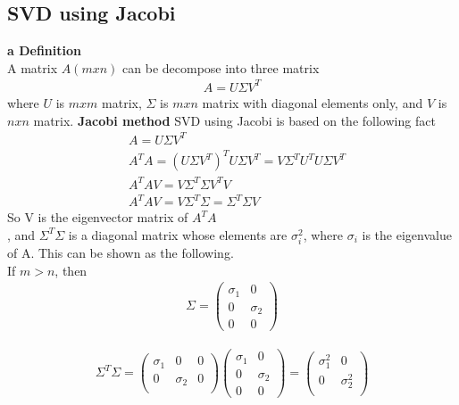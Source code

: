 \documentclass[a4paper]{article}
\begin{document}
\subsection{SVD using Jacobi}
{\bf a Definition}\\
A matrix $A(mxn)$ can be decompose into three matrix
\begin{align*}
	A = U \Sigma V^T
\end{align*}
where $U$ is $mxm$ matrix, $\Sigma$ is $mxn$ matrix with diagonal elements only, and $V$ is $nxn$ matrix.
{\bf Jacobi method}
SVD using Jacobi is based on the following fact
\begin{align*}
	& A = U \Sigma V^T \\
	& A^T A = (U \Sigma V^T)^T U \Sigma V^T = V \Sigma^T U^T U\Sigma V^T \\
	& A^T A V = V \Sigma^T \Sigma V^T V \\
	& A^T A V = V \Sigma^T \Sigma = \Sigma^T \Sigma V
\end{align*}
So V is the eigenvector matrix of $A^T A$\\, and $\Sigma^T \Sigma$ is a diagonal matrix whose elements are $\sigma_i^2$, where $\sigma_i$ is the eigenvalue of A. This can be shown as the following.\\
If $m >n $, then\\
\begin{align*}
	\Sigma = \left(  \begin{array} {cc}
		\sigma_1 & 0 \\
		0 & \sigma_2\\
		0 & 0
	\end{array} \right)
\end{align*}

\begin{align*}
	\Sigma^T \Sigma = \left(  \begin{array} {ccc}
		\sigma_1 & 0 & 0 \\
		0 & \sigma_2 & 0\\
	\end{array} \right)
	\left(  \begin{array} {cc}
		\sigma_1 & 0 \\
		0 & \sigma_2\\
		0 & 0
	\end{array} \right)
	= \left(  \begin{array} {cc}
		\sigma_1^2 & 0 \\
		0 & \sigma_2^2\\
	\end{array} \right)
\end{align*}	
\end{document}
